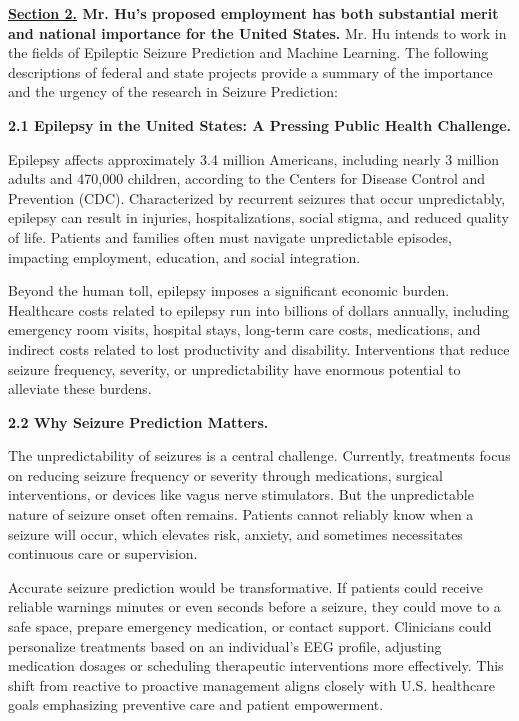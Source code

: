 \documentclass{article}
\begin{document}
\clearpage


{\bf \underline{Section 2.} Mr. Hu’s proposed employment has both substantial merit and national importance for the United States.}
Mr. Hu intends to work in the fields of Epileptic Seizure Prediction and Machine Learning. The following descriptions of federal and state projects provide a summary of the importance and the urgency of the research in  Seizure Prediction:

{\bf 2.1 Epilepsy in the United States: A Pressing Public Health Challenge. }

Epilepsy affects approximately 3.4 million Americans, including nearly 3 million adults and 470,000 children, according to the Centers for Disease Control and Prevention (CDC). Characterized by recurrent seizures that occur unpredictably, epilepsy can result in injuries, hospitalizations, social stigma, and reduced quality of life. Patients and families often must navigate unpredictable episodes, impacting employment, education, and social integration.

Beyond the human toll, epilepsy imposes a significant economic burden. Healthcare costs related to epilepsy run into billions of dollars annually, including emergency room visits, hospital stays, long-term care costs, medications, and indirect costs related to lost productivity and disability. Interventions that reduce seizure frequency, severity, or unpredictability have enormous potential to alleviate these burdens.


{\bf 2.2 Why Seizure Prediction Matters. }

The unpredictability of seizures is a central challenge. Currently, treatments focus on reducing seizure frequency or severity through medications, surgical interventions, or devices like vagus nerve stimulators. But the unpredictable nature of seizure onset often remains. Patients cannot reliably know when a seizure will occur, which elevates risk, anxiety, and sometimes necessitates continuous care or supervision.

Accurate seizure prediction would be transformative. If patients could receive reliable warnings minutes or even seconds before a seizure, they could move to a safe space, prepare emergency medication, or contact support. Clinicians could personalize treatments based on an individual’s EEG profile, adjusting medication dosages or scheduling therapeutic interventions more effectively. This shift from reactive to proactive management aligns closely with U.S. healthcare goals emphasizing preventive care and patient empowerment.
\end{document}
